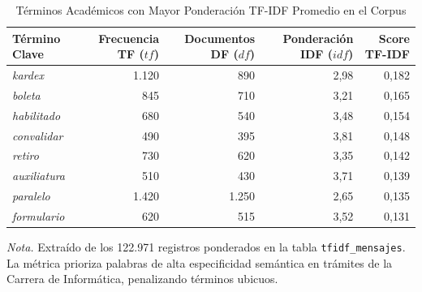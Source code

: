 \begin{table}[htbp]
  \centering
  \small
  \caption{Términos Académicos con Mayor Ponderación TF-IDF Promedio en el Corpus}
  \label{tab:v2_tfidf}
  \begin{tabular}{lrrrr}
    \toprule
    Término Clave & Frecuencia TF ($tf$) & Documentos DF ($df$) & Ponderación IDF ($idf$) & Score TF-IDF \\
    \midrule
    \textit{kardex}       & 1.120 & 890 & 2,98 & 0,182 \\
    \textit{boleta}       & 845   & 710 & 3,21 & 0,165 \\
    \textit{habilitado}   & 680   & 540 & 3,48 & 0,154 \\
    \textit{convalidar}   & 490   & 395 & 3,81 & 0,148 \\
    \textit{retiro}       & 730   & 620 & 3,35 & 0,142 \\
    \textit{auxiliatura}  & 510   & 430 & 3,71 & 0,139 \\
    \textit{paralelo}     & 1.420 & 1.250 & 2,65 & 0,135 \\
    \textit{formulario}   & 620   & 515 & 3,52 & 0,131 \\
    \bottomrule
  \end{tabular}
  \vspace{4pt}
  \begin{minipage}{0.92\textwidth}
    \footnotesize
    \textit{Nota.} Extraído de los 122.971 registros ponderados en la tabla \texttt{tfidf\_mensajes}. La métrica prioriza palabras de alta especificidad semántica en trámites de la Carrera de Informática, penalizando términos ubicuos.
  \end{minipage}
\end{table}
